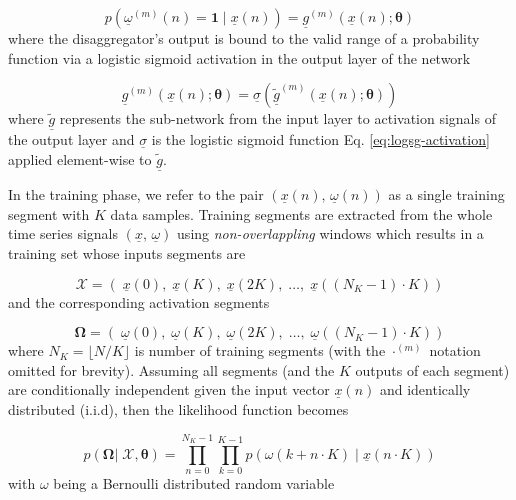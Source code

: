 \documentclass[twocolumn,letter,10pt]{IEEEtran} %
\begin{document}
{\small\begin{equation}
	p\left(\underline{\omega}^{(m)}(n)=\bm{1}\;\big|\;\underline{x}(n)\right) = \underline{g}^{(m)}\left(\underline{x}(n); \bm{\theta}\right)
	\end{equation}}%
where the disaggregator's output is bound to the valid range of a probability function via a logistic sigmoid activation in the output layer of the network

{\small\begin{equation}
	\underline{g}^{(m)}\left(\underline{x}(n); \bm{\theta}\right) = \underline{\sigma}\left(\underline{\tilde{g}}^{(m)}\left(\underline{x}(n); \bm{\theta}\right)\right)
	\end{equation}}%
where $\underline{\tilde{g}}$ represents the sub-network from the input layer to activation signals of the output layer and $\underline{\sigma}$ is the logistic sigmoid function Eq. \ref{eq:logsg-activation} applied element-wise to $\underline{\tilde{g}}$. 

In the training phase, we refer to the pair $\left(\underline{x}(n),\,\underline{\omega}(n)\right)$ as a single training segment with $K$ data samples. Training segments are extracted from the whole time series signals $\left(\underline{x},\,\underline{\omega}\right)$ using \emph{non-overlappling} windows which results in a training set whose inputs segments are

{\small\begin{equation}
	\bm{\mathcal{X}} =\left(\; \underline{x}(0),\; \underline{x}(K),\; \underline{x}(2K),\; \dots,\;\underline{x}((N_K-1)\cdot K)\right)
	\label{eq:condition-prob}
	\end{equation}}%
and the corresponding activation segments 

{\small\begin{equation}
	\bm{\Omega} = \left(\; \underline{\omega}(0),\; \underline{\omega}(K),\; \underline{\omega}(2K),\; \dots,\; \underline{\omega}((N_K-1)\cdot K)\right)
	\end{equation}}%
where $N_K = \lfloor N / K\rfloor$ is number of training segments (with the $\cdot^{(m)}$ notation omitted for brevity). Assuming all segments (and the $K$ outputs of each segment) are conditionally independent given the input vector $\underline{x}(n)$ and identically distributed (i.i.d), then the likelihood function becomes


{\small\begin{equation*}
	p\left(\bm{\Omega} |\; \bm{\mathcal{X}}, \bm{\theta} \right) = \prod_{n=0}^{N_K-1} \prod_{k=0}^{K-1} p\left(\omega(k + n\cdot K) \;|\; \underline{x}(n\cdot K)\right)
	\end{equation*}}%
with $\omega$ being a Bernoulli distributed random variable
\end{document}

